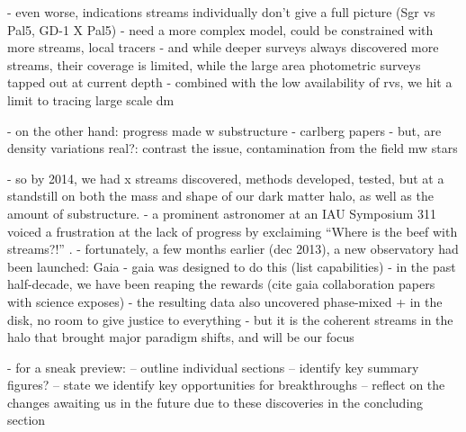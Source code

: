 \documentclass[final,5p,times,twocolumn,authoryear]{elsarticle}
\begin{document}
- even worse, indications streams individually don't give a full picture (Sgr vs Pal5, GD-1 X Pal5)
- need a more complex model, could be constrained with more streams, local tracers
- and while deeper surveys always discovered more streams, their coverage is limited, while the large area photometric surveys tapped out at current depth
- combined with the low availability of rvs, we hit a limit to tracing large scale dm

- on the other hand: progress made w substructure
- carlberg papers
- but, are density variations real?: contrast the issue, contamination from the field mw stars

- so by 2014, we had x streams discovered, methods developed, tested, but at a standstill on both the mass and shape of our dark matter halo, as well as the amount of substructure.
- a prominent astronomer at an IAU Symposium 311 voiced a frustration at the lack of progress by exclaiming ``Where is the beef with streams?!'' \citep{binney:2014}.
- fortunately, a few months earlier (dec 2013), a new observatory had been launched: Gaia
- gaia was designed to do this (list capabilities)
- in the past half-decade, we have been reaping the rewards (cite gaia collaboration papers with science exposes)
- the resulting data also uncovered phase-mixed + in the disk, no room to give justice to everything
- but it is the coherent streams in the halo that brought major paradigm shifts, and will be our focus

- for a sneak preview:
-- outline individual sections
-- identify key summary figures?
-- state we identify key opportunities for breakthroughs
-- reflect on the changes awaiting us in the future due to these discoveries in the concluding section



\end{document}

